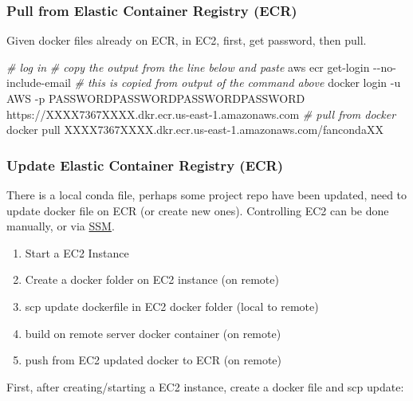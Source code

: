 \documentclass[
]{book}
\newenvironment{Shaded}{\begin{snugshade}}{\end{snugshade}}
\newcommand{\CommentTok}[1]{\textcolor[rgb]{0.56,0.35,0.01}{\textit{#1}}}
\newcommand{\ExtensionTok}[1]{#1}
\newcommand{\NormalTok}[1]{#1}
\providecommand{\tightlist}{%
  \setlength{\itemsep}{0pt}\setlength{\parskip}{0pt}}
\begin{document}
\hypertarget{pull-from-elastic-container-registry-ecr}{%
\subsubsection{Pull from Elastic Container Registry (ECR)}\label{pull-from-elastic-container-registry-ecr}}

Given docker files already on ECR, in EC2, first, get password, then pull.

\begin{Shaded}
\begin{Highlighting}[]
\CommentTok{\# log in}
\CommentTok{\# copy the output from the line below and paste}
\ExtensionTok{aws}\NormalTok{ ecr get{-}login {-}{-}no{-}include{-}email}
\CommentTok{\# this is copied from output of the command above}
\ExtensionTok{docker}\NormalTok{ login {-}u AWS {-}p PASSWORDPASSWORDPASSWORDPASSWORD https://XXXX7367XXXX.dkr.ecr.us{-}east{-}1.amazonaws.com}
\CommentTok{\# pull from docker}
\ExtensionTok{docker}\NormalTok{ pull XXXX7367XXXX.dkr.ecr.us{-}east{-}1.amazonaws.com/fancondaXX}
\end{Highlighting}
\end{Shaded}

\hypertarget{update-elastic-container-registry-ecr}{%
\subsubsection{Update Elastic Container Registry (ECR)}\label{update-elastic-container-registry-ecr}}

There is a local conda file, perhaps some project repo have been updated, need to update docker file on ECR (or create new ones). Controlling EC2 can be done manually, or via \href{https://docs.aws.amazon.com/systems-manager/latest/userguide/prereqs-ssm-agent.html}{SSM}.

\begin{enumerate}
\def\labelenumi{\arabic{enumi}.}
\tightlist
\item
  Start a EC2 Instance
\item
  Create a docker folder on EC2 instance (on remote)
\item
  scp update dockerfile in EC2 docker folder (local to remote)
\item
  build on remote server docker container (on remote)
\item
  push from EC2 updated docker to ECR (on remote)
\end{enumerate}

First, after creating/starting a EC2 instance, create a docker file and scp update:
\end{document}
